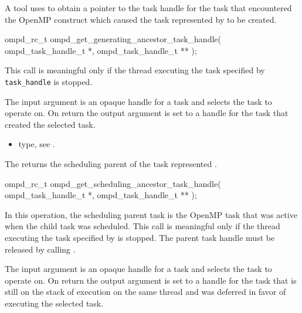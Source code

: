 \label{ompd:ompd_get_generating_ancestor_task_handle}
\summary
A tool uses  to obtain
a pointer to the task handle for the task that encountered the OpenMP construct which caused the 
task represented by  to be created.

\format

\cspecificstart
\begin{ompSyntax}
ompd_rc_t ompd_get_generating_ancestor_task_handle(
  ompd_task_handle_t *,
  ompd_task_handle_t **
);
\end{ompSyntax}
\cspecificend


\descr
This call is meaningful only if the thread executing the task specified by
\verb|task_handle|  is stopped.

\argdesc
The input argument  is an opaque handle for a task and selects the task to operate on.
On return the output argument  is set to a handle for the task
that created the selected task.

\crossreferences
\begin{itemize}
	\item {} type, see .
\end{itemize}


\label{ompd:ompd_get_scheduling_ancestor_task_handle}
\summary
The  returns the
scheduling parent of the task represented .

\format

\cspecificstart
\begin{ompSyntax}
ompd_rc_t ompd_get_scheduling_ancestor_task_handle(
  ompd_task_handle_t *,
  ompd_task_handle_t **
);
\end{ompSyntax}
\cspecificend


\descr
In this operation, the scheduling parent task is the OpenMP task that was active when
the child task was scheduled. This call is meaningful only if the thread executing the task specified 
by   is stopped. The parent task handle must be released by calling 
.

\argdesc
The input argument  is an opaque handle for a task and selects the task to operate on.
On return the output argument  is set to a handle for the task that is 
still on the stack of execution on the same thread and was deferred in favor of executing the selected task.

